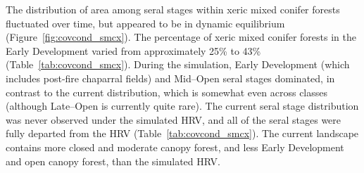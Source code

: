 The distribution of area among seral stages within xeric mixed conifer forests fluctuated over time, but appeared to be in dynamic equilibrium (Figure~\ref{fig:covcond_smcx}). The percentage of xeric mixed conifer forests in the Early Development varied from approximately 25\% to 43\% (Table~\ref{tab:covcond_smcx}). During the simulation, Early Development (which includes post-fire chaparral fields) and Mid--Open seral stages dominated, in contrast to the current distribution, which is somewhat even across classes (although Late--Open is currently quite rare).
%
The current seral stage distribution was never observed under the simulated HRV, and all of the seral stages were fully departed from the HRV (Table~\ref{tab:covcond_smcx}). The current landscape contains more closed and moderate canopy forest, and less Early Development and open canopy forest, than the simulated HRV.


